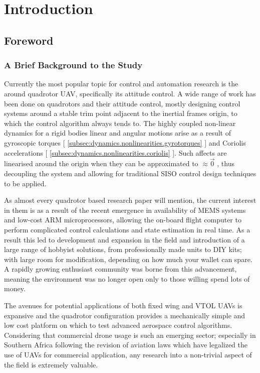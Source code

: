 \chapter{Introduction}
\label{ch:intro}
\section{Foreword}
\label{sec:intro.foreword}
\subsection{A Brief Background to the Study}
\label{subsec:intro.foreword.background}
Currently the most popular topic for control and automation research is the around quadrotor UAV, specifically its attitude control. A wide range of work has been done on quadrotors and their attitude control, mostly designing control systems around a stable trim point adjacent to the inertial frames origin, to which the control algorithm always tends to. The highly coupled non-linear dynamics for a rigid bodies linear and angular motions arise as a result of gyroscopic torques [ \ref{subsec:dynamics.nonlinearities.gyrotorques} ] and Coriolis accelerations [ \ref{subsec:dynamics.nonlinearities.coriolis} ]. Such affects are linearised around the origin when they can be approximated to $\approx \vec{0}$ , thus decoupling the system and allowing for traditional SISO control design techniques to be applied.
\par
As almost every quadrotor based research paper will mention, the current interest in them is as a result of the recent emergence in availability of MEMS systems and low-cost ARM microprocessors, allowing the on-board flight computer to perform complicated control calculations and state estimation in real time. As a result this led to development and expansion in the field and introduction of a large range of hobbyist solutions, from professionally made units to DIY kits; with large room for modification, depending on how much your wallet can spare. A rapidly growing enthusiast community was borne from this advancement, meaning the environment was no longer open only to those willing spend lots of money.
\par
The avenues for potential applications of both fixed wing and VTOL UAVs is expansive and the quadrotor configuration provides a mechanically simple and low cost platform on which to test advanced aerospace control algorithms. Considering that commercial drone usage is such an emerging sector; especially in Southern Africa following the revision of aviation laws \cite{safedrone} which have legalized the use of UAVs for commercial application, any research into a non-trivial aspect of the field is extremely valuable. 
